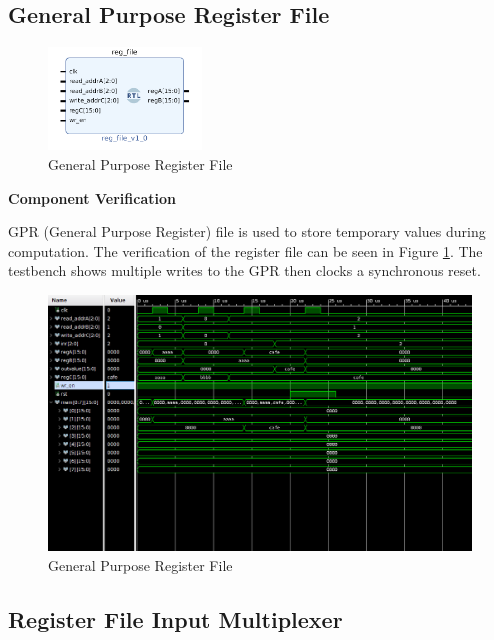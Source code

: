 \documentclass{article}
\newcommand{\stitle}{Component Verification}
\begin{document}
\begin{par}
	\newpage

	\subsection{General Purpose Register File}
	
	\begin{figure}[H]
		\centering
		\includegraphics[width=1.6in]{img/regFile.png}
		\caption{General Purpose Register File}
	\end{figure}
	
	\textbf{\stitle}
	\begin{par}
		GPR (General Purpose Register) file is used to store temporary values during computation. The verification of the register file can be seen in Figure \ref{fig:gprtb}. The testbench shows multiple writes to the GPR then clocks a synchronous reset. 
	\end{par} 

	\begin{figure}[H]
		\centering
		\includegraphics[width=6in]{img/regFileTB.png}
		\caption{General Purpose Register File}
		\label{fig:gprtb}
	\end{figure}

	\newpage
	
	\subsection{Register File Input Multiplexer}
	

\end{par}
\end{document}
